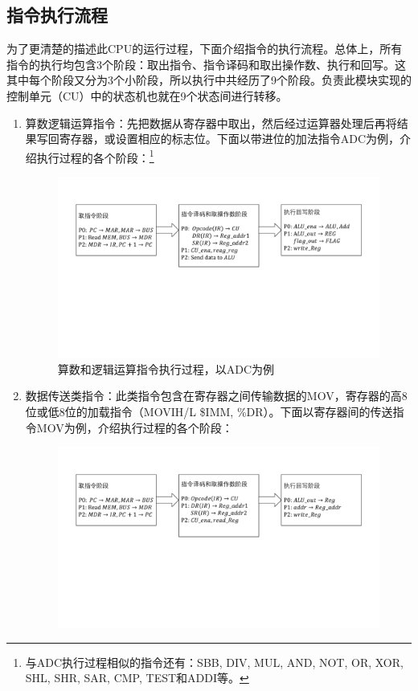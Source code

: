 \documentclass[titlepage, 11pt]{article}
\begin{document}
	\subsection{指令执行流程}
	为了更清楚的描述此CPU的运行过程，下面介绍指令的执行流程。总体上，所有指令的执行均包含3个阶段：取出指令、指令译码和取出操作数、执行和回写。这其中每个阶段又分为3个小阶段，所以执行中共经历了9个阶段。负责此模块实现的控制单元（CU）中的状态机也就在9个状态间进行转移。\par 
	\begin{enumerate}
		\item 算数逻辑运算指令：先把数据从寄存器中取出，然后经过运算器处理后再将结果写回寄存器，或设置相应的标志位。下面以带进位的加法指令ADC为例，介绍执行过程的各个阶段：\footnote{与ADC执行过程相似的指令还有：SBB, DIV, MUL, AND, NOT, OR, XOR, SHL, SHR, SAR, CMP, TEST和ADDI等。}
		\begin{figure}[H]
			\centering
			\includegraphics[scale=0.5]{4.pdf}
			\caption{算数和逻辑运算指令执行过程，以ADC为例}
		\end{figure}
		\item 数据传送类指令：此类指令包含在寄存器之间传输数据的MOV，寄存器的高8位或低8位的加载指令（MOVIH/L \$IMM, \%DR）。下面以寄存器间的传送指令MOV为例，介绍执行过程的各个阶段：
		\begin{figure}[H]
			\centering
			\includegraphics[scale=0.5]{5.pdf}

\end{figure}
\end{enumerate}
\end{document}
